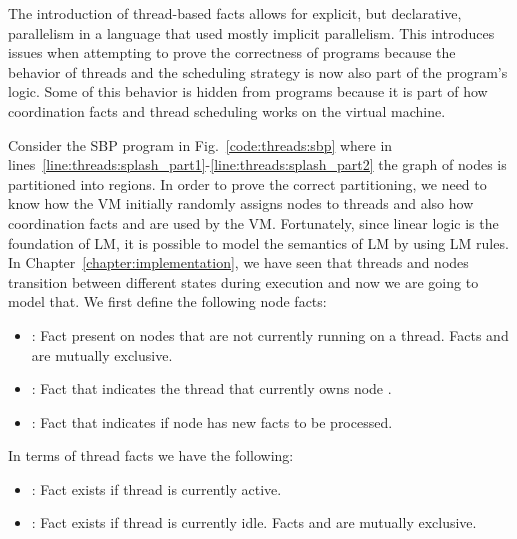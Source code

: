 The introduction of thread-based facts allows for explicit, but declarative,
parallelism in a language that used mostly implicit parallelism. This
introduces issues when attempting to prove the correctness of programs because
the behavior of threads and the scheduling strategy is now also part of the
program's logic.  Some of this behavior is hidden from programs because it is part
of how coordination facts and thread scheduling works on the virtual machine.

Consider the SBP program in Fig.~\ref{code:threads:sbp} where in
lines~\ref{line:threads:splash_part1}-\ref{line:threads:splash_part2} the graph
of nodes is partitioned into regions. In order to prove the correct
partitioning, we need to know how the VM initially randomly assigns nodes to
threads and also how coordination facts  and 
are used by the VM. Fortunately, since linear logic is the foundation of LM, it
is possible to model the semantics of LM by using LM rules. In
Chapter~\ref{chapter:implementation}, we have seen that threads and nodes
transition between different states during execution and now we are going to
model that. We first define the following node facts:

\begin{itemize}

   \item {}: Fact present on nodes that are not currently
      running on a thread. Facts  and  are
      mutually exclusive.

   \item {}: Fact that indicates the thread
       that currently owns node .

   \item {}: Fact that indicates if node
       has new facts to be processed.

\end{itemize}

In terms of thread facts we have the following:

\begin{itemize}
   \item {}: Fact exists if thread  is currently
      active.

   \item {}: Fact exists if thread  is currently
      idle. Facts  and  are mutually exclusive.
\end{itemize}

